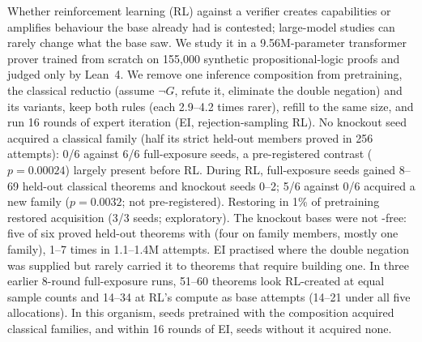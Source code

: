 Whether reinforcement learning (RL) against a verifier creates capabilities or amplifies behaviour the
base already had is contested; large-model studies can rarely change what the base saw. We study it in a
9.56M-parameter transformer prover trained from scratch on 155,000 synthetic propositional-logic proofs and judged only
by Lean~4. We remove one inference composition from pretraining, the classical reductio \sig{} (assume $\neg G$, refute
it, eliminate the double negation) and its variants, keep both rules (each 2.9--4.2 times rarer), refill to
the same size, and run 16 rounds of expert iteration (EI, rejection-sampling RL). No knockout seed acquired a
classical family (half its strict held-out members proved in 256 attempts): 0/6 against 6/6 full-exposure seeds, a
pre-registered contrast ($p=0.00024$) largely present before RL. During RL, full-exposure seeds gained 8--69 held-out
classical theorems and knockout seeds 0--2; 5/6 against 0/6 acquired a new family ($p=0.0032$; not pre-registered).
Restoring \sig{} in 1\% of pretraining restored acquisition (3/3 seeds; exploratory). The knockout bases were not
\sig-free: five of six proved held-out theorems with \sig{} (four on family members, mostly one family), 1--7 times in
1.1--1.4M attempts. EI practised \sig{} where the double negation was supplied but rarely carried it to theorems that require building one. In
three earlier 8-round full-exposure runs, 51--60 theorems look RL-created at equal sample counts and 14--34 at
RL's compute as base attempts (14--21 under all five allocations). In this organism, seeds pretrained with the composition acquired classical families, and within 16
rounds of EI, seeds without it acquired none.
